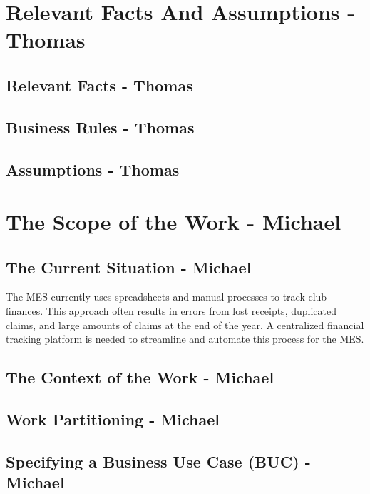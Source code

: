 \documentclass[12pt]{article}
\begin{document}
\section{Relevant Facts And Assumptions - Thomas}
  \subsection{Relevant Facts - Thomas}
  \subsection{Business Rules - Thomas}
  \subsection{Assumptions - Thomas}

\section{The Scope of the Work - Michael}
  \subsection{The Current Situation - Michael}
    The MES currently uses spreadsheets and manual processes
    to track club finances. This approach often results in errors from lost receipts,
    duplicated claims, and large amounts of claims at the end of the year. A centralized
    financial tracking platform is needed to streamline and automate
    this process for the MES.

  \subsection{The Context of the Work - Michael}
  \subsection{Work Partitioning - Michael}
  \subsection{Specifying a Business Use Case (BUC) - Michael}

\end{document}

